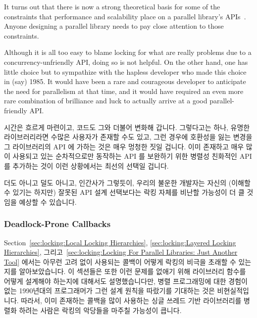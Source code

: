 It turns out that there is now a strong theoretical basis for some of the
constraints that performance and scalability place on a parallel library's
APIs~\cite{HagitAttiya2011LawsOfOrder,Attiya:2011:LOE:1925844.1926442,PaulEMcKenney2011SNC}.
Anyone designing a parallel library needs to pay close attention to
those constraints.

Although it is all too easy to blame locking for what are really problems
due to a concurrency-unfriendly API, doing so is not helpful.
On the other hand, one has little choice but to sympathize with the
hapless developer who made this choice in (say) 1985.
It would have been a rare and courageous developer to anticipate the
need for parallelism at that time, and it would have required an
even more rare combination of brilliance and luck to actually arrive
at a good parallel-friendly API.
\fi

시간은 흐르게 마련이고, 코드도 그와 더불어 변화해 갑니다.
그렇다고는 하나, 유명한 라이브러리라면 수많은 사용자가 존재할 수도 있고, 그런
경우에 호환성을 잃는 변경을 그 라이브러리의 API 에 가하는 것은 매우 멍청한 짓일
겁니다.
이미 존재하고 매우 많이 사용되고 있는 순차적으로만 동작하는 API 를 보완하기
위한 병렬성 친화적인 API 를 추가하는 것이 이런 상황에서는 최선의 선택일 겁니다.

더도 아니고 덜도 아니고, 인간사가 그렇듯이, 우리의 불운한 개발자는 자신의
(이해할 수 있기는 하지만) 잘못된 API 설계 선택보다는 락킹 자체를 비난할
가능성이 더 클 것임을 예상할 수 있습니다.

\subsubsection{Deadlock-Prone Callbacks}
\label{sec:locking:Deadlock-Prone Callbacks}

Section~\ref{sec:locking:Local Locking Hierarchies},
\ref{sec:locking:Layered Locking Hierarchies},
그리고~\ref{sec:locking:Locking For Parallel Libraries: Just Another Tool}
에서는 아무런 고려 없이 사용되는 콜백이 어떻게 락킹의 비극을 초래할 수 있는지를
알아보았습니다.
이 섹션들은 또한 이런 문제를 없애기 위해 라이브러리 함수를 어떻게 설계해야
하는지에 대해서도 설명했습니다만, 병렬 프로그래밍에 대한 경험이 없는 1990년대의
프로그래머가 그런 설계 원칙을 따랐기를 기대하는 것은 비현실적입니다.
따라서, 이미 존재하는 콜백을 많이 사용하는 싱글 쓰레드 기반 라이브러리를 병렬화
하려는 사람은 락킹의 악당들을 마주칠 가능성이 큽니다.
\iffalse

